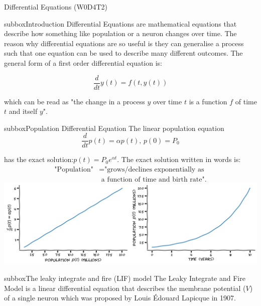 \begin{textbox}{Differential Equations (W0D4T2) }
\begin{subbox}{subbox}{Introduction}
\scriptsize
Differential Equations are mathematical equations that describe how something like population or a neuron changes over time. The reason why differential equations are so useful is they can generalise a process such that one equation can be used to describe many different outcomes.
The general form of a first order differential equation is:

\begin{equation}
\frac{d}{dt}y(t) = f\left( t,y(t) \right)
\end{equation}

which can be read as "the change in a process $y$ over time $t$ is a function $f$ of time $t$ and itself $y$".

\end{subbox}
\begin{subbox}{subbox}{Population Differential Equation}
\scriptsize
The linear population equation 
\begin{equation}
\frac{d}{dt}p(t) = \alpha p(t), \, p(0)=P_0
\end{equation}

has the exact solution:$p(t) = P_0 e^{\alpha t}.$
The exact solution written in words is: 
\begin{align*}
\text{"Population"} &= \text{"grows/declines exponentially as}\\ &\text{ a function of time and birth rate"}.
\end{align*}
\centering
\includegraphics[scale=0.15]{Figures/PreCourse/CFigure5.png}
\end{subbox}
\begin{subbox}{subbox}{The leaky integrate and fire (LIF) model}
\scriptsize
The Leaky Integrate and Fire Model is a linear differential equation that describes the membrane potential ($V$) of a single neuron which was proposed by Louis Édouard Lapicque in 1907.


\end{subbox}
\end{textbox}
